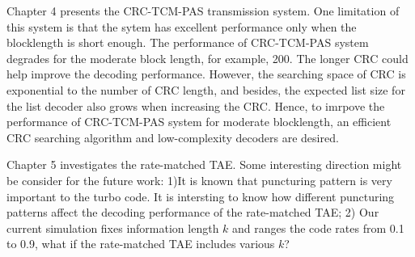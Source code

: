 \documentclass [PhD] {uclathes}
\begin{document}
Chapter 4 presents the CRC-TCM-PAS transmission system. One limitation of this system is that the sytem has excellent performance only when the blocklength is short enough. The performance of CRC-TCM-PAS system degrades for the moderate block length, for example, 200. The longer CRC could help improve the decoding performance. However, the searching space of CRC is exponential to the number of CRC length, and besides, the expected list size for the list decoder also grows when increasing the CRC. Hence, to imrpove the performance of CRC-TCM-PAS system for moderate blocklength, an efficient CRC searching algorithm and low-complexity decoders are desired.  

Chapter 5 investigates the rate-matched TAE. Some interesting direction might be consider for the future work: 1)It is known that puncturing pattern is very important to the turbo code. It is intersting to know how different puncturing patterns affect the decoding performance of the rate-matched TAE; 2) Our current  simulation fixes information length $k$ and ranges the code rates from 0.1 to 0.9, what if the rate-matched TAE includes various $k$? 



%
\end{document}
